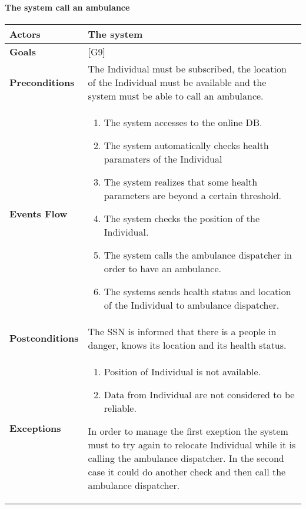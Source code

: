 \documentclass[12pt]{article}
\begin{document}
  
\newpage              
\paragraph{ The system call an ambulance} 
\begin{center}
    \begin{tabular} { |p{}|p{}| }
         \hline
         \textbf{Actors} & The system \\ 
         \hline
         \textbf{Goals} & {[G9]} \\ 
         \hline  
         \textbf{Preconditions} & The Individual must be subscribed, the location of the Individual must be available and the system must be able to call an ambulance. \\ 
         \hline
         \textbf{Events Flow} & \begin{enumerate}[topsep=0pt]
             \setlength{\itemsep}{0.5pt}
             \item The system accesses to the online DB.
             \item The system automatically checks health paramaters of the Individual 
             \item The system realizes that some health parameters are beyond a certain threshold. 
             \item The system checks the position of the Individual. 
             \item The system calls the ambulance dispatcher in order to have an ambulance. 
             \item The systems sends health status and location of the Individual to ambulance dispatcher. 
             \end{enumerate} \\ 
        \hline 
        \textbf{Postconditions} & The SSN is informed that there is a people in danger, knows its location and its health status. \\ 
        \hline
         \textbf{Exceptions} & \begin{enumerate}[topsep=0pt] 
              \setlength{\itemsep}{0.5pt}
              \item Position of Individual is not available. 
              \item Data from Individual are not considered to be reliable. 
              \end{enumerate}
            In order to manage the first exeption the system must to try again to relocate Individual while it is calling the ambulance dispatcher. In the second case it could do another check and then call the ambulance dispatcher. \\
             \hline
    \end{tabular}
\end{center}
\end{document}
